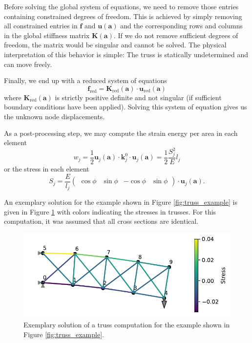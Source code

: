 Before solving the global system of equations, we need to remove those entries containing constrained degrees of freedom. This is achieved by simply removing all constrained entries in $\mathbf{f}$ and $\mathbf{u}(\mathbf{a})$ and the corresponding rows and columns in the global stiffness matrix $\mathbf{K}(\mathbf{a})$. If we do not remove sufficient degrees of freedom, the matrix would be singular and cannot be solved. The physical interpretation of this behavior is simple: The truss is statically undetermined and can move freely. 

Finally, we end up with a reduced system of equations 
\begin{equation}
     \mathbf{f}_\textrm{red} = \mathbf{K}_\textrm{red}(\mathbf{a})  \cdot \mathbf{u}_\textrm{red} (\mathbf{a})
     \label{eq:reduced_system}
\end{equation}
where $\mathbf{K}_\textrm{red}(\mathbf{a})$ is strictly positive definite and not singular (if sufficient boundary conditions have been applied). Solving this system of equation gives us the unknown node displacements. 

As a post-processing step, we may compute the strain energy per area in each element 
\begin{equation}
    w_j = \frac{1}{2}\mathbf{u}_j (\mathbf{a}) \cdot \mathbf{k}^0_j \cdot \mathbf{u}_j (\mathbf{a}) = \frac{1}{2} \frac{S_j^2}{E} l_j
    \label{eq:element_strain_energy}
\end{equation}
or the stress in each element 
\begin{equation}
    S_j = \frac{E}{l_j} 
    \begin{pmatrix}
        \cos{\phi} & \sin{\phi} & -\cos{\phi} & \sin{\phi}
    \end{pmatrix}
    \cdot 
    \mathbf{u}_j(\mathbf{a}).
\end{equation}

An exemplary solution for the example shown in Figure \ref{fig:truss_example} is given in Figure \ref{fig:truss_example_solved} with colors indicating the stresses in trusses. For this computation, it was assumed that all cross sections are identical.

\begin{figure}[!htpb]
    \centering
    \includegraphics[width=\textwidth]{figures/truss_sample_solved.pdf}
    \caption{Exemplary solution of a truss computation for the example shown in Figure \ref{fig:truss_example}.}
    \label{fig:truss_example_solved}
\end{figure}

